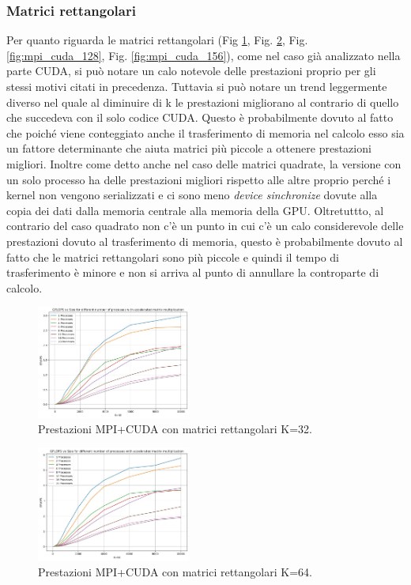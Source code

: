 \documentclass[conference]{IEEEtran}
\begin{document}
\subsubsection{Matrici rettangolari}
Per quanto riguarda le matrici rettangolari (Fig \ref{fig:mpi_cuda_32}, Fig. \ref{fig:mpi_cuda_64}, Fig. \ref{fig:mpi_cuda_128}, Fig. \ref{fig:mpi_cuda_156}), come nel caso già analizzato nella parte CUDA, si può notare un calo notevole delle prestazioni proprio per gli stessi motivi citati in precedenza. Tuttavia si può notare un trend leggermente diverso nel quale al diminuire di k le prestazioni migliorano al contrario di quello che succedeva con il solo codice CUDA. Questo è probabilmente dovuto al fatto che poiché viene conteggiato anche il trasferimento di memoria nel calcolo esso sia un fattore determinante che aiuta matrici più piccole a ottenere prestazioni migliori.
Inoltre come detto anche nel caso delle matrici quadrate, la versione con un solo processo ha delle prestazioni migliori rispetto alle altre proprio perché i kernel non vengono serializzati e ci sono meno \textit{device sinchronize} dovute alla copia dei dati dalla memoria centrale alla memoria della GPU. Oltretuttto, al contrario del caso quadrato non c'è un punto in cui c'è un calo considerevole delle prestazioni dovuto al trasferimento di memoria, questo è probabilmente dovuto al fatto che le matrici rettangolari sono più piccole e quindi il tempo di trasferimento è minore e non si arriva al punto di annullare la controparte di calcolo.
\begin{figure}[H]
    \centering
    \includegraphics[width=0.45\textwidth]{resources/mpi_cuda_32.jpg}
    \caption{Prestazioni MPI+CUDA con matrici rettangolari K=32.}
    \label{fig:mpi_cuda_32}
\end{figure}
\begin{figure}[H]
    \centering
    \includegraphics[width=0.45\textwidth]{resources/mpi_cuda_64.jpg}
    \caption{Prestazioni MPI+CUDA con matrici rettangolari K=64.}
    \label{fig:mpi_cuda_64}
\end{figure}
\end{document}
